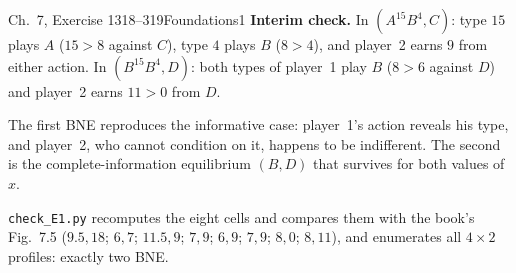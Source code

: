 \begin{exsol}{\MG{} Ch.~7, Exercise 1}{318--319}{Foundations}{1}
\textbf{Interim check.} In $(A^{15}B^{4},C)$: type $15$ plays $A$ ($15>8$ against $C$), type $4$
plays $B$ ($8>4$), and player~2 earns $9$ from either action. In $(B^{15}B^{4},D)$: both types of
player~1 play $B$ ($8>6$ against $D$) and player~2 earns $11>0$ from $D$.

\interp The first BNE reproduces the informative case: player~1's action reveals his type, and
player~2, who cannot condition on it, happens to be indifferent. The second is the
complete-information equilibrium $(B,D)$ that survives for both values of $x$.

\verify \texttt{check\_E1.py} recomputes the eight cells and compares them with the book's
Fig.~7.5 ($9.5,18$; $6,7$; $11.5,9$; $7,9$; $6,9$; $7,9$; $8,0$; $8,11$), and enumerates all
$4\times 2$ profiles: exactly two BNE.

\end{exsol}
